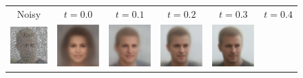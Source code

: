\documentclass{article} %
\theoremstyle{definition}
\begin{document}
\begin{figure}[htb]
    \setlength{\tabcolsep}{0pt} %
    \renewcommand{\arraystretch}{0.5} %
    \begin{adjustbox}{max width=1.0\textwidth}
    \begin{tabular}{c@{}c@{}c@{}c@{}c@{}c@{}}

  \hspace{-4mm} Noisy & $t = 0.0$ & $t = 0.1$ & $t = 0.2$ & $t = 0.3$ & $t = 0.4$ \\ 
             \includegraphics[width=.19\textwidth]{figures/celeba/progression/random_inpainting_noisy_batch11_im1_pnsr11.23.pdf} 
            & \includegraphics[width=.19\textwidth]{figures/celeba/progression/random_inpainting_pnp_flow_batch11_im1_iter0_pnsr8.23.pdf} &

            \includegraphics[width=.19\textwidth]{figures/celeba/progression/random_inpainting_pnp_flow_batch11_im1_iter10_pnsr13.98.pdf} &

            \includegraphics[width=.19\textwidth]{figures/celeba/progression/random_inpainting_pnp_flow_batch11_im1_iter20_pnsr18.01.pdf} &

            \includegraphics[width=.19\textwidth]{figures/celeba/progression/random_inpainting_pnp_flow_batch11_im1_iter30_pnsr21.02.pdf} &


\end{tabular}
\end{adjustbox}
\end{figure}
\end{document}
